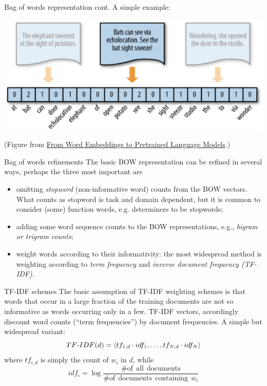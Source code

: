\documentclass[style=upen, size=14pt]{powerdot}
\newcommand{\gold}{\color{arany}}
\theoremstyle{definition}
\begin{document}
 
 \begin{slide}[toc=]{Bag of words representation cont.}
   A simple example:\smallskip
   
   \includegraphics[width=1.0\textwidth]{figures/bow.eps}

   \begin{center}
     \footnotesize{(Figure from \href{https://towardsdatascience.com/from-word-embeddings-to-pretrained-language-models-a-new-age-in-nlp-part-1-7ed0c7f3dfc5}{From Word Embeddings to Pretrained Language Models}.)}     
   \end{center}
 \end{slide}

 \begin{slide}[toc=]{Bag of words refinements}
   The basic BOW representation can be refined in several ways, perhaps the
   three most important are
   \begin{itemize}
   \item omitting \emph{\gold stopword} (non-informative word) counts from the
     BOW vectors. What counts as stopword is task and domain dependent, but it
     is common to consider (some) function words, e.g. determiners to be
     stopwords;
   \item adding some word sequence counts to the BOW representations, e.g.,
     \emph{\gold bigram or trigram counts};
   \item weight words according to their informativity: the most widespread
     method is weighting according to \emph{\gold term frequency} and
     \emph{\gold inverse document frequency (TF-IDF)}.
   \end{itemize}
 \end{slide}


 \begin{slide}[toc=TF-IDF]{TF-IDF schemes}
   The basic assumption of TF-IDF weighting schemes is that words that occur in
   a large fraction of the training documents are not so informative as words
   occurring only in a few. TF-IDF vectors, accordingly discount word counts
   (``term frequencies'') by document frequencies. A simple but widespread
   variant:
   $$TF{\text -}IDF(d)=\langle tf_{1,d}\cdot idf_1, \dots, tf_{N,d}\cdot idf_N\rangle$$
   where $tf_{i,d}$ is simply the count of $w_i$ in $d$, while
   $$
   idf_i = \log\frac{\mathrm{\# of~~all~~documents}}{\mathrm{\# of~~documents~~containing}~~w_i  }
   $$
 \end{slide}
\end{document}

